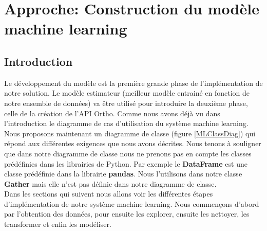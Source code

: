 \documentclass[12pt, french]{report}
\begin{document}


\newpage

\chapter{Approche: Construction du modèle machine learning}
\section{Introduction}

Le développement du modèle est la première grande phase de l'implémentation de notre solution. Le modèle estimateur (meilleur modèle entrainé en fonction de notre ensemble de données) va être utilisé pour introduire la deuxième phase, celle de la création de l'API Ortho. Comme nous avons déjà vu dans l'introduction le diagramme de cas d'utilisation du système machine learning. Nous proposons maintenant un diagramme de classe (figure \ref{MLClassDiag}) qui répond aux différentes exigences que nous avons décrites. Nous tenons à souligner que dans notre diagramme de classe nous ne prenons pas en compte les classes prédéfinies dans les librairies de Python. Par exemple le \textbf{DataFrame} est une classe prédéfinie dans la librairie \textbf{pandas}. Nous l'utilisons dans notre classe \textbf{Gather} mais elle n'est pas définie dans notre diagramme de classe.  \\ 



Dans les sections qui suivent nous allons voir les différentes étapes d'implémentation de notre système machine learning. Nous commençons d'abord par l'obtention des données, pour ensuite les explorer, ensuite les nettoyer, les transformer et enfin les modéliser. 
\end{document}
